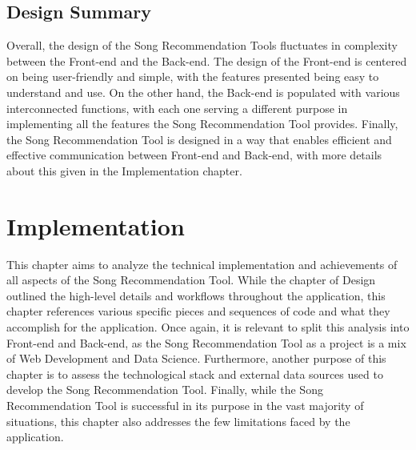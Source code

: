 \documentclass{l4proj}
\begin{document}
\section{Design Summary}
Overall, the design of the Song Recommendation Tools fluctuates in complexity between the Front-end and the Back-end. The design of the Front-end is centered on being user-friendly and simple, with the features presented being easy to understand and use. On the other hand, the Back-end is populated with various interconnected functions, with each one serving a different purpose in implementing all the features the Song Recommendation Tool provides. Finally, the Song Recommendation Tool is designed in a way that enables efficient and effective communication between Front-end and Back-end, with more details about this given in the Implementation chapter.
\chapter{Implementation}
This chapter aims to analyze the technical implementation and achievements of all aspects of the Song Recommendation Tool. While the chapter of Design outlined the high-level details and workflows throughout the application, this chapter references various specific pieces and sequences of code and what they accomplish for the application. Once again, it is relevant to split this analysis into Front-end and Back-end, as the Song Recommendation Tool as a project is a mix of Web Development and Data Science. Furthermore, another purpose of this chapter is to assess the technological stack and external data sources used to develop the Song Recommendation Tool. Finally, while the Song Recommendation Tool is successful in its purpose in the vast majority of situations, this chapter also addresses the few limitations faced by the application. 
\end{document}
